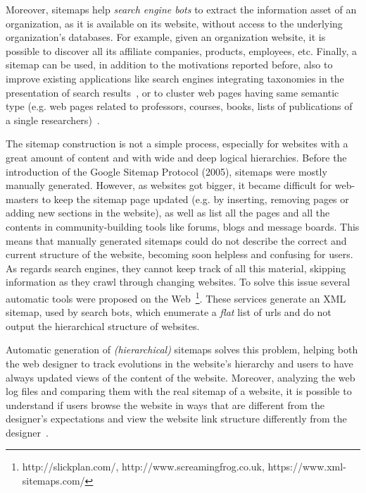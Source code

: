 Moreover, sitemaps help \emph{search engine bots} to extract the information asset of an organization, as it is available on its website, without access to the underlying organization's databases. For example, given an organization website, it is possible to discover all its affiliate companies, products, employees, etc. Finally, a sitemap can be used, in addition to the motivations reported before, also to improve existing applications like search engines integrating taxonomies in the presentation of search results~\cite{Keller:2013}, or to cluster web pages having same semantic type (e.g. web pages related to professors, courses, books, lists of publications of a single researchers)~\cite{Lin:2010b}. 

The sitemap construction is not a simple process, especially for websites with a great amount of content and with  wide and deep logical hierarchies.  Before the introduction of the Google Sitemap Protocol (2005), sitemaps were mostly manually generated. However, as websites got bigger, it became difficult for web-masters to keep the sitemap page updated (e.g. by inserting, removing pages or adding new sections in the website), as well as list all the pages and all the contents in community-building tools like forums, blogs and message boards. This means that manually generated sitemaps could do not describe the correct and current structure of the website, becoming soon helpless and confusing for users. As regards search engines, they cannot keep track of all this material, skipping information as they crawl through changing websites. To solve this issue several automatic tools were proposed on the Web~\footnote{http://slickplan.com/, http://www.screamingfrog.co.uk, https://www.xml-sitemaps.com/}. These services generate an XML sitemap, used by search bots, which enumerate a \emph{flat} list of urls and do not output the hierarchical structure of websites.

Automatic generation of \emph{(hierarchical)} sitemaps solves this problem, helping both the web designer to track evolutions in the website's hierarchy and users to have always updated views of the content of the website. Moreover, analyzing the web log files and comparing them with the real sitemap of a website, it is possible to understand if users browse the website in ways that are different from the designer's expectations and view the website link structure differently from the designer~\cite{Anderson:2001}. 


